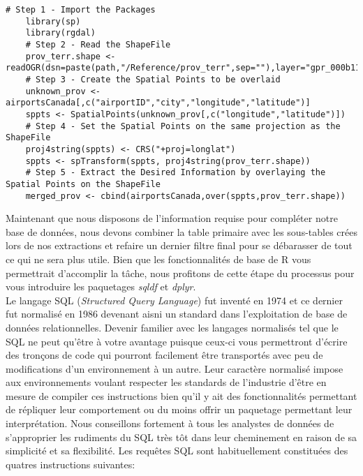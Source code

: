 \begin{lstlisting}[caption = Traitement standard de données géospatiales en R,label=src:GeoDataR]
	# Step 1 - Import the Packages	
	library(sp)
	library(rgdal)
	# Step 2 - Read the ShapeFile
	prov_terr.shape <- readOGR(dsn=paste(path,"/Reference/prov_terr",sep=""),layer="gpr_000b11a_e")
	# Step 3 - Create the Spatial Points to be overlaid
	unknown_prov <- airportsCanada[,c("airportID","city","longitude","latitude")]
	sppts <- SpatialPoints(unknown_prov[,c("longitude","latitude")])
	# Step 4 - Set the Spatial Points on the same projection as the ShapeFile
	proj4string(sppts) <- CRS("+proj=longlat")
	sppts <- spTransform(sppts, proj4string(prov_terr.shape))
	# Step 5 - Extract the Desired Information by overlaying the Spatial Points on the ShapeFile
	merged_prov <- cbind(airportsCanada,over(sppts,prov_terr.shape))
\end{lstlisting}

\vspace{\baselineskip}
\noindent
Maintenant que nous disposons de l'information requise pour compléter notre base de données, nous devons combiner la table primaire avec les sous-tables crées lors de nos extractions et refaire un dernier filtre final pour se débarasser de tout ce qui ne sera plus utile. Bien que les fonctionnalités de base de R vous permettrait d'accomplir la tâche, nous profitons de cette étape du processus pour vous introduire les paquetages \emph{sqldf} et \emph{dplyr}. \\

\noindent
Le langage SQL (\emph{Structured Query Language}) fut inventé en 1974 et ce dernier fut normalisé en 1986 devenant aisni un standard dans l'exploitation de base de données relationnelles. Devenir familier avec les langages normalisés tel que le SQL ne peut qu'être à votre avantage puisque ceux-ci vous permettront d'écrire des tronçons de code qui pourront facilement être transportés avec peu de modifications d'un environnement à un autre. Leur caractère normalisé impose aux environnements voulant respecter les standards de l'industrie d'être en mesure de compiler ces instructions bien qu'il y ait des fonctionnalités permettant de répliquer leur comportement ou du moins offrir un paquetage permettant leur interprétation. \cite{SQL} Nous conseillons fortement à tous les analystes de données de s'approprier les rudiments du SQL très tôt dans leur cheminement en raison de sa simplicité et sa flexibilité. Les requêtes SQL sont habituellement constituées des quatres instructions suivantes: \\

